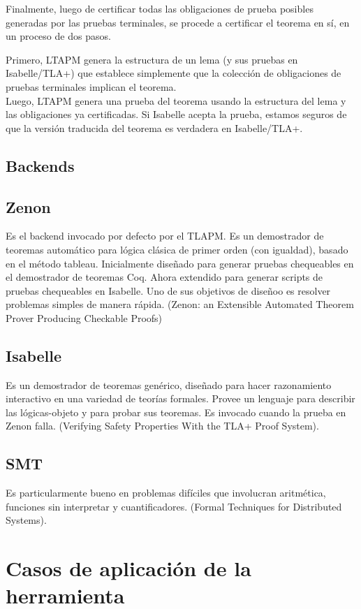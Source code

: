 \documentclass[spanish]{llncs}
\begin{document}
  Finalmente, luego de certificar todas las obligaciones de prueba posibles generadas por las pruebas
  terminales, se procede a certificar el teorema en sí, en un proceso de dos pasos. 
  
  Primero, LTAPM genera la estructura de un lema (y sus pruebas en Isabelle/TLA+) que establece simplemente que la colección de
  obligaciones de pruebas terminales implican el teorema.
  \\
  
  Luego, LTAPM genera una prueba del teorema usando la estructura del lema y las obligaciones ya certificadas. Si Isabelle acepta la prueba, estamos seguros de que la versión traducida del teorema es verdadera en Isabelle/TLA+.

  \subsection{Backends}
  \subsection*{Zenon}
	Es el backend invocado por defecto por el TLAPM. Es un demostrador de teoremas automático para lógica clásica de primer orden (con igualdad), basado en el método tableau. Inicialmente diseñado para generar pruebas chequeables en el demostrador de teoremas Coq. Ahora extendido para generar scripts de pruebas chequeables en Isabelle. Uno de sus objetivos de diseñoo es resolver problemas simples de manera rápida.
	(Zenon: an Extensible Automated Theorem Prover Producing Checkable Proofs)
  \subsection*{Isabelle}    
	Es un demostrador de teoremas genérico, diseñado para hacer razonamiento interactivo en una variedad de teorías formales. Provee un lenguaje para describir las lógicas-objeto y para probar sus teoremas. Es invocado cuando la prueba en Zenon falla.
	(Verifying Safety Properties With the TLA+ Proof System).
  \subsection*{SMT}
	Es particularmente bueno en problemas difíciles que involucran aritmética, funciones sin interpretar y cuantificadores.
	(Formal Techniques for Distributed Systems).

\section{Casos de aplicación de la herramienta}
\end{document}
